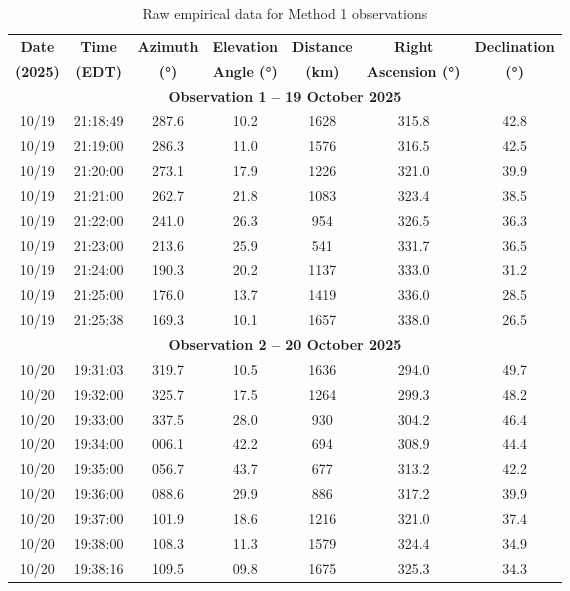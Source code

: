 \documentclass{article}
\begin{document}
\begin{table}[H]
    \centering
    \caption{Raw empirical data for Method 1 observations}
    \label{tab:method1_data}
    \renewcommand{\arraystretch}{1.2}
    \begin{tabular}{|c|c|c|c|c|c|c|}
        \hline
        \textbf{Date} & \textbf{Time} & \textbf{Azimuth} & \textbf{Elevation} & \textbf{Distance} & \textbf{Right} & \textbf{Declination} \\ 
        \textbf{(2025)} & \textbf{(EDT)} & \textbf{(°)} & \textbf{Angle (°)} & \textbf{(km)} & \textbf{Ascension (°)} & \textbf{(°)} \\ \hline
        \multicolumn{7}{|c|}{\textbf{Observation 1 – 19 October 2025}} \\ \hline
        10/19 & 21:18:49 & 287.6 & 10.2 & 1628 & 315.8 & 42.8 \\ \hline
        10/19 & 21:19:00 & 286.3 & 11.0 & 1576 & 316.5 & 42.5 \\ \hline
        10/19 & 21:20:00 & 273.1 & 17.9 & 1226 & 321.0 & 39.9 \\ \hline
        10/19 & 21:21:00 & 262.7 & 21.8 & 1083 & 323.4 & 38.5 \\ \hline
        10/19 & 21:22:00 & 241.0 & 26.3 &  954 & 326.5 & 36.3 \\ \hline
        10/19 & 21:23:00 & 213.6 & 25.9 &  541 & 331.7 & 36.5 \\ \hline
        10/19 & 21:24:00 & 190.3 & 20.2 & 1137 & 333.0 & 31.2 \\ \hline
        10/19 & 21:25:00 & 176.0 & 13.7 & 1419 & 336.0 & 28.5 \\ \hline
        10/19 & 21:25:38 & 169.3 & 10.1 & 1657 & 338.0 & 26.5 \\ \hline
        \multicolumn{7}{|c|}{\textbf{Observation 2 – 20 October 2025}} \\ \hline
        10/20 & 19:31:03 & 319.7 & 10.5 & 1636 & 294.0 & 49.7 \\ \hline
        10/20 & 19:32:00 & 325.7 & 17.5 & 1264 & 299.3 & 48.2 \\ \hline
        10/20 & 19:33:00 & 337.5 & 28.0 &  930 & 304.2 & 46.4 \\ \hline
        10/20 & 19:34:00 & 006.1 & 42.2 &  694 & 308.9 & 44.4 \\ \hline
        10/20 & 19:35:00 & 056.7 & 43.7 &  677 & 313.2 & 42.2 \\ \hline
        10/20 & 19:36:00 & 088.6 & 29.9 &  886 & 317.2 & 39.9 \\ \hline
        10/20 & 19:37:00 & 101.9 & 18.6 & 1216 & 321.0 & 37.4 \\ \hline
        10/20 & 19:38:00 & 108.3 & 11.3 & 1579 & 324.4 & 34.9 \\ \hline
        10/20 & 19:38:16 & 109.5 & 09.8 & 1675 & 325.3 & 34.3 \\ \hline
    \end{tabular}
\end{table}
\end{document}
